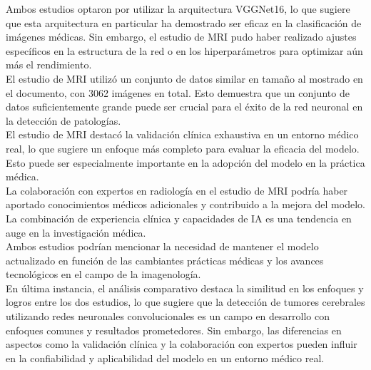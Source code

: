 \documentclass[12pt,twoside,titlepage]{ingenius}
\begin{document}
\begin{multicols}{2}
Ambos estudios optaron por utilizar la arquitectura VGGNet16, lo que sugiere que esta arquitectura en particular ha demostrado ser eficaz en la clasificación de imágenes médicas. Sin embargo, el estudio de MRI pudo haber realizado ajustes específicos en la estructura de la red o en los hiperparámetros para optimizar aún más el rendimiento.\\

El estudio de MRI utilizó un conjunto de datos similar en tamaño al mostrado en el documento, con 3062 imágenes en total. Esto demuestra que un conjunto de datos suficientemente grande puede ser crucial para el éxito de la red neuronal en la detección de patologías.\\

El estudio de MRI destacó la validación clínica exhaustiva en un entorno médico real, lo que sugiere un enfoque más completo para evaluar la eficacia del modelo. Esto puede ser especialmente importante en la adopción del modelo en la práctica médica.\\

La colaboración con expertos en radiología en el estudio de MRI podría haber aportado conocimientos médicos adicionales y contribuido a la mejora del modelo. La combinación de experiencia clínica y capacidades de IA es una tendencia en auge en la investigación médica.\\

Ambos estudios podrían mencionar la necesidad de mantener el modelo actualizado en función de las cambiantes prácticas médicas y los avances tecnológicos en el campo de la imagenología.\\

En última instancia, el análisis comparativo destaca la similitud en los enfoques y logros entre los dos estudios, lo que sugiere que la detección de tumores cerebrales utilizando redes neuronales convolucionales es un campo en desarrollo con enfoques comunes y resultados prometedores. Sin embargo, las diferencias en aspectos como la validación clínica y la colaboración con expertos pueden influir en la confiabilidad y aplicabilidad del modelo en un entorno médico real.\\


\end{multicols}
\end{document}
